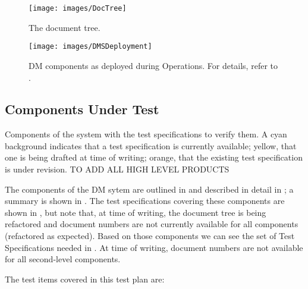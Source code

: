 \begin{figure}
\begin{center}
 \texttt{[image: images/DocTree]}

 \caption{The \product{} document tree.}
 \label{fig:doctree}

\end{center}
\end{figure}

\begin{figure}[htbp]
	\begin{center}
		\texttt{[image: images/DMSDeployment]}
		\caption{DM components as deployed during Operations. For details, refer to .
		\label{fig:dmsdeploy}}
	\end{center}
\end{figure}

\subsection{Components Under Test}

\begin{table}
	\caption{Components of the \product{} system with the test specifications to verify them.
    A cyan background indicates that a test specification is currently available; yellow, that one is being drafted at time of writing; orange, that the existing test specification is under revision. TO ADD ALL HIGH LEVEL PRODUCTS}
    \label{tab:testspecs}
	
\end{table}

The components of the DM sytem are outlined in  and described in detail in ; a summary is shown in .
The test specifications covering these components are shown in , but note that, at time of writing, the document tree is being refactored and document numbers are not currently available for all components (refactored as expected).
Based on those components we can see the set of Test Specifications needed in .
At time of writing, document numbers are not available for all second-level components.

The test items covered in this test plan are:

